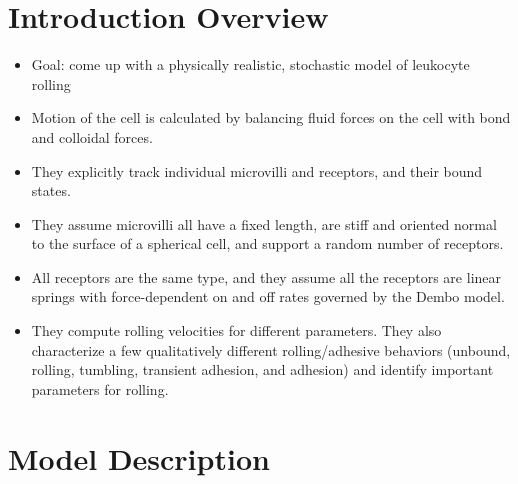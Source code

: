\documentclass[
10pt, %
letterpaper, %
twocolumn, %
landscape %
]{article}
\begin{document}
\pagestyle{myheadings} %
\markright{\doctitle} %


\thispagestyle{plain} %

\printtitle %


\section{Introduction Overview}

\begin{itemize}
\item Goal: come up with a physically realistic, stochastic model of
  leukocyte rolling
\item Motion of the cell is calculated by balancing fluid forces on
  the cell with bond and colloidal forces.
\item They explicitly track individual microvilli and receptors, and
  their bound states. 
\item They assume microvilli all have a fixed length, are stiff and
  oriented normal to the surface of a spherical cell, and support a
  random number of receptors.
\item All receptors are the same type, and they assume all the
  receptors are linear springs with force-dependent on and off rates
  governed by the Dembo model. 
\item They compute rolling velocities for different parameters. They
  also characterize a few qualitatively different rolling/adhesive
  behaviors (unbound, rolling, tumbling, transient adhesion, and
  adhesion) and identify important parameters for rolling.
\end{itemize}


\section{Model Description}
\end{document}
